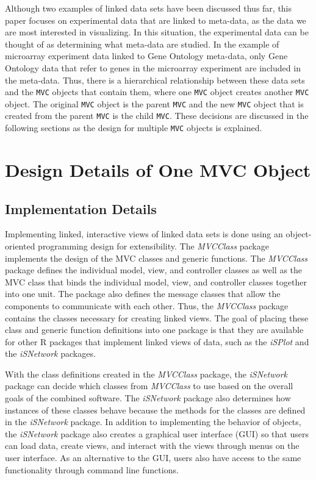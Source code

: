 \documentclass{article}[11pt]
\newcommand{\Robject}[1]{{\texttt{#1}}}
\newcommand{\Rpackage}[1]{{\textit{#1}}}
\newcommand{\Rclass}[1]{\textsf{#1}}
\begin{document}
Although two examples of linked data sets have been discussed thus far,
this paper focuses on experimental data that are linked to meta-data, as
the data we are most interested in visualizing.  In this situation, the
experimental data can be thought of as determining what meta-data are studied.
In the example of microarray experiment data linked to Gene Ontology
meta-data, only Gene Ontology data that refer to genes in the microarray
experiment are included in the meta-data.  Thus, there is a hierarchical
relationship between these data sets and the \Robject{MVC} objects that
contain them, where one \Robject{MVC} object creates another \Robject{MVC}
object.  The original \Robject{MVC} object is the parent \Robject{MVC} and the
new \Robject{MVC} object that is created from the parent \Robject{MVC} is the
child \Robject{MVC}.  These decisions are discussed in the following sections
as the design for multiple \Robject{MVC} objects is explained. 

\section{Design Details of One MVC Object}\label{Sec:OneMVC}

\subsection{Implementation Details}\label{SSec:OneOver}

Implementing linked, interactive views of linked data sets is done using an
object-oriented programming design for extensibility.  The \Rpackage{MVCClass}
package implements the design of the MVC classes and generic functions.  The
\Rpackage{MVCClass} package defines the individual model,
view, and controller classes as well as the \Rclass{MVC}
class that binds the individual model, view, and
controller classes together into one unit.  The package also defines
the message classes that allow the components to communicate with
each other.  Thus, the \Rpackage{MVCClass} package contains the classes
necessary for creating linked views.   The goal of placing these class and
generic function definitions into one package is that they are available for
other R packages that implement linked views of data, such as the
\Rpackage{iSPlot} and the \Rpackage{iSNetwork} packages. 

With the class definitions created in the \Rpackage{MVCClass} package, the
\Rpackage{iSNetwork} package can decide which classes from \Rpackage{MVCClass}
to use based on the overall goals of the combined software.  The
\Rpackage{iSNetwork} package also determines how instances of these classes
behave because the methods for the classes are defined in the
\Rpackage{iSNetwork} package.  In addition to implementing the behavior of
objects, the \Rpackage{iSNetwork} package also creates a graphical user
interface (GUI) so that users can load data, create views, and interact with
the views through menus on the user interface.  As an alternative to the GUI,
users also have access to the same functionality through command line
functions.  
\end{document}
